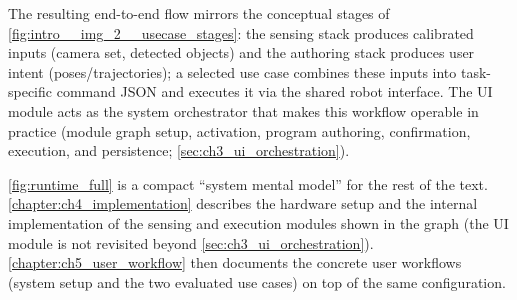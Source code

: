 The resulting end-to-end flow mirrors the conceptual stages of \autoref{fig:intro__img_2__usecase_stages}:
the sensing stack produces calibrated inputs (camera set, detected objects) and the authoring stack produces user intent (poses/trajectories);
a selected use case combines these inputs into task-specific command JSON and executes it via the shared robot interface.
The UI module acts as the system orchestrator that makes this workflow operable in practice (module graph setup, activation, program authoring, confirmation, execution, and persistence; \autoref{sec:ch3_ui_orchestration}).


\autoref{fig:runtime_full} is a compact ``system mental model'' for the rest of the text.
\autoref{chapter:ch4_implementation} describes the hardware setup and the internal implementation of the sensing and execution modules shown in the graph (the UI module is not revisited beyond \autoref{sec:ch3_ui_orchestration}).
\autoref{chapter:ch5_user_workflow} then documents the concrete user workflows (system setup and the two evaluated use cases) on top of the same configuration.











